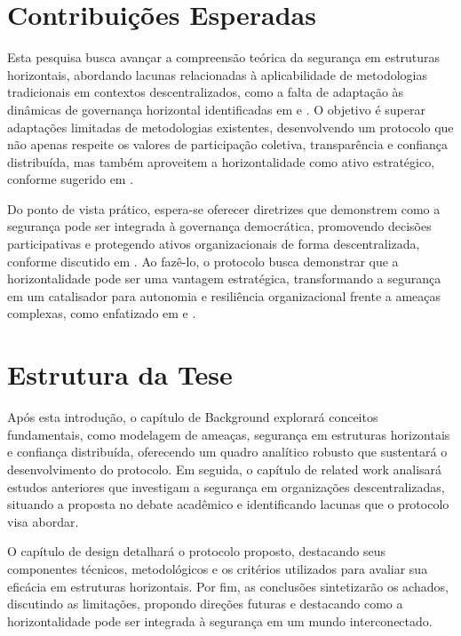 \section{Contribuições Esperadas} 
\label{sec:contribuicoes_esperadas}

Esta pesquisa busca avançar a compreensão teórica da segurança em
estruturas horizontais, abordando lacunas relacionadas à aplicabilidade de
metodologias tradicionais em contextos descentralizados, como a falta de
adaptação às dinâmicas de governança horizontal identificadas em
\cite{ThreatModelingAsABasisForSecurityRequirements} e
\cite{DemystifyingTheThreatModelingProcess}. O objetivo é superar
adaptações limitadas de metodologias existentes, desenvolvendo um protocolo
que não apenas respeite os valores de participação coletiva, transparência
e confiança distribuída, mas também aproveitem a horizontalidade como ativo
estratégico, conforme sugerido em \cite{Colbac}.

Do ponto de vista prático, espera-se oferecer diretrizes que demonstrem
como a segurança pode ser integrada à governança democrática, promovendo
decisões participativas e protegendo ativos organizacionais de forma
descentralizada, conforme discutido em \cite{Non-HierarchicalForms}. Ao
fazê-lo, o protocolo busca demonstrar que a horizontalidade pode ser uma
vantagem estratégica, transformando a segurança em um catalisador para
autonomia e resiliência organizacional frente a ameaças complexas, como
enfatizado em \cite{Reputation-basedDAO} e \cite{AbcCrypto}.



\section{Estrutura da Tese} 
\label{sec:estrutura_tese}

Após esta introdução, o capítulo de Background explorará conceitos
fundamentais, como modelagem de ameaças, segurança em estruturas
horizontais e confiança distribuída, oferecendo um quadro analítico robusto
que sustentará o desenvolvimento do protocolo. Em seguida, o capítulo de
related work analisará estudos anteriores que investigam a segurança em
organizações descentralizadas, situando a proposta no debate acadêmico e
identificando lacunas que o protocolo visa abordar.

O capítulo de design detalhará o protocolo proposto, destacando seus
componentes técnicos, metodológicos e os critérios utilizados para avaliar
sua eficácia em estruturas horizontais. Por fim, as conclusões sintetizarão
os achados, discutindo as limitações, propondo direções futuras e
destacando como a horizontalidade pode ser integrada à segurança em um
mundo interconectado.

